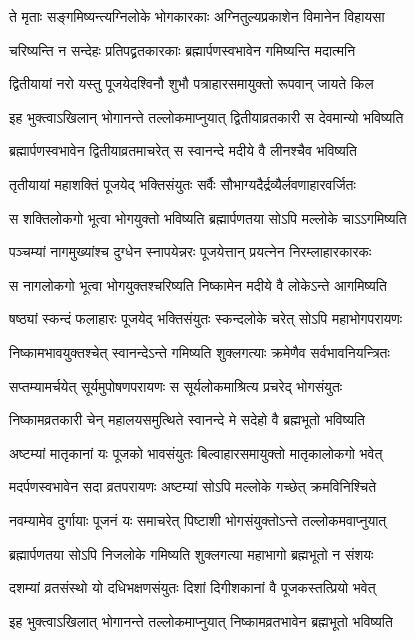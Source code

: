 \twolineshloka
{ते मृताः सङ्गमिष्यन्त्यग्निलोके भोगकारकाः}
{अग्नितुल्यप्रकाशेन विमानेन विहायसा} %

\twolineshloka
{चरिष्यन्ति न सन्देहः प्रतिपद्व्रतकारकाः}
{ब्रह्मार्पणस्वभावेन गमिष्यन्ति मदात्मनि} %

\twolineshloka
{द्वितीयायां नरो यस्तु पूजयेदश्विनौ शुभौ}
{पत्राहारसमायुक्तो रूपवान् जायते किल} %

\twolineshloka
{इह भुक्त्वाऽखिलान् भोगानन्ते तल्लोकमाप्नुयात्}
{द्वितीयाव्रतकारी स देवमान्यो भविष्यति} %

\twolineshloka
{ब्रह्मार्पणस्वभावेन द्वितीयाव्रतमाचरेत्}
{स स्वानन्दे मदीये वै लीनश्चैव भविष्यति} %

\twolineshloka
{तृतीयायां महाशक्तिं पूजयेद् भक्तिसंयुतः}
{सर्वैः सौभाग्यदैर्द्रव्यैर्लवणाहारवर्जितः} %

\twolineshloka
{स शक्तिलोकगो भूत्वा भोगयुक्तो भविष्यति}
{ब्रह्मार्पणतया सोऽपि मल्लोके चाऽऽगमिष्यति} %

\twolineshloka
{पञ्चम्यां नागमुख्यांश्च दुग्धेन स्नापयेन्नरः}
{पूजयेत्तान् प्रयत्नेन निरम्लाहारकारकः} %

\twolineshloka
{स नागलोकगो भूत्वा भोगयुक्तश्चरिष्यति}
{निष्कामेन मदीये वै लोकेऽन्ते आगमिष्यति} %

\twolineshloka
{षष्ठ्यां स्कन्दं फलाहारः पूजयेद् भक्तिसंयुतः}
{स्कन्दलोके चरेत् सोऽपि महाभोगपरायणः} %

\twolineshloka
{निष्कामभावयुक्तश्चेत् स्वानन्देऽन्ते गमिष्यति}
{शुक्लगत्याः क्रमेणैव सर्वभावनियन्त्रितः} %

\twolineshloka
{सप्तम्यामर्चयेत् सूर्यमुपोषणपरायणः}
{स सूर्यलोकमाश्रित्य प्रचरेद् भोगसंयुतः} %

\twolineshloka
{निष्कामव्रतकारी चेन् महालयसमुत्थिते}
{स्वानन्दे मे सदेहो वै ब्रह्मभूतो भविष्यति} %

\twolineshloka
{अष्टम्यां मातृकानां यः पूजको भावसंयुतः}
{बिल्वाहारसमायुक्तो मातृकालोकगो भवेत्} %

\twolineshloka
{मदर्पणस्वभावेन सदा व्रतपरायणः}
{अष्टम्यां सोऽपि मल्लोके गच्छेत् क्रमविनिश्चिते} %

\twolineshloka
{नवम्यामेव दुर्गायाः पूजनं यः समाचरेत्}
{पिष्टाशी भोगसंयुक्तोऽन्ते तल्लोकमवाप्नुयात्} %

\twolineshloka
{ब्रह्मार्पणतया सोऽपि निजलोके गमिष्यति}
{शुक्लगत्या महाभागो ब्रह्मभूतो न संशयः} %

\twolineshloka
{दशम्यां व्रतसंस्थो यो दधिभक्षणसंयुतः}
{दिशां दिगीशकानां वै पूजकस्तत्प्रियो भवेत्} %

\twolineshloka
{इह भुक्त्वाऽखिलात् भोगानन्ते तल्लोकमाप्नुयात्}
{निष्कामव्रतभावेन ब्रह्मभूतो भविष्यति} %

